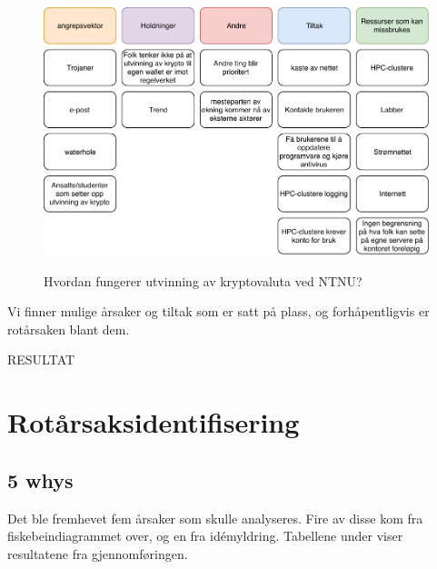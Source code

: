 \begin{figure}[H]
    \centering
    \includegraphics[scale=0.6]{case_3/bilder/AD.pdf}
    \label{fig:AD_miner}
    \caption{Hvordan fungerer utvinning av kryptovaluta ved NTNU?}
\end{figure}

Vi finner mulige årsaker og tiltak som er satt på plass, og forhåpentligvis er rotårsaken blant dem.

RESULTAT

\section{Rotårsaksidentifisering}
\subsection{5 whys}
Det ble fremhevet fem årsaker som skulle analyseres. Fire av disse kom fra fiskebeindiagrammet over, og en fra idémyldring. Tabellene under viser resultatene fra gjennomføringen. 

